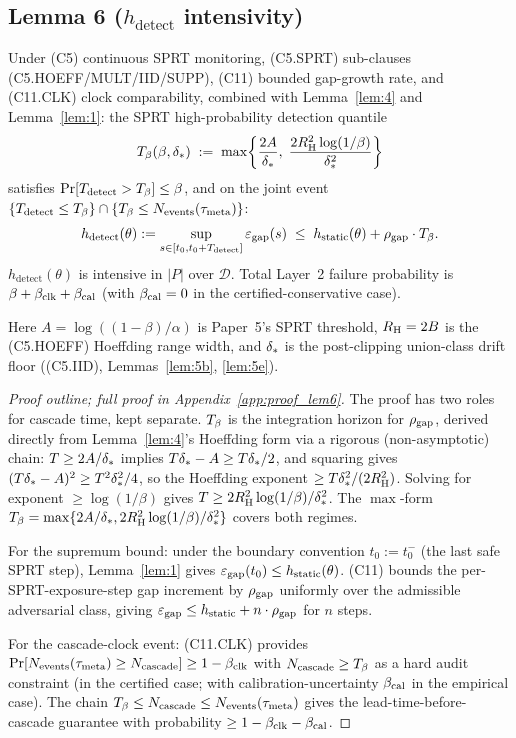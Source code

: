 \subsection{Lemma 6 (\texorpdfstring{$h_{\mathrm{detect}}$}{h\_detect} intensivity)}
\label{sec:lem6}

\renewcommand{\thelemma}{\arabic{lemma}}
\begin{lemma}
\label{lem:6}
Under (C5) continuous SPRT monitoring, (C5.SPRT) sub-clauses
(C5.HOEFF/MULT/IID/SUPP), (C11) bounded gap-growth rate, and
(C11.CLK) clock comparability, combined with Lemma~\ref{lem:4}
and Lemma~\ref{lem:1}: the SPRT high-probability detection quantile
\[
  T_{\beta}(\beta, \delta_{*}) \;:=\;
  \max\!\left\{\frac{2A}{\delta_{*}},\;
  \frac{2 R_{\mathrm{H}}^2 \log(1/\beta)}{\delta_{*}^2}\right\}
\]
satisfies $\Pr[T_{\mathrm{detect}} > T_{\beta}] \leq \beta$, and on
the joint event $\{T_{\mathrm{detect}} \leq T_{\beta}\} \cap \{T_{\beta}
\leq N_{\mathrm{events}}(\tau_{\mathrm{meta}})\}$:
\[
  h_{\mathrm{detect}}(\theta) := \sup_{s \in [t_0, t_0 +
  T_{\mathrm{detect}}]} \varepsilon_{\mathrm{gap}}(s) \;\leq\;
  h_{\mathrm{static}}(\theta) + \rho_{\mathrm{gap}} \cdot T_{\beta}.
\]
$h_{\mathrm{detect}}(\theta)$ is intensive in $|P|$ over
$\mathcal{D}$.  Total Layer~2 failure probability is $\beta + \beta_{\mathrm{clk}}
+ \beta_{\mathrm{cal}}$ (with $\beta_{\mathrm{cal}} = 0$ in the certified-conservative case).

Here $A = \log((1-\beta)/\alpha)$ is Paper~5's SPRT threshold,
$R_{\mathrm{H}} = 2B$ is the (C5.HOEFF) Hoeffding range width, and
$\delta_{*}$ is the post-clipping union-class drift floor
((C5.IID), Lemmas~\ref{lem:5b}, \ref{lem:5e}).
\end{lemma}

\begin{proof}[Proof outline; full proof in Appendix~\ref{app:proof_lem6}]
The proof has two roles for cascade time, kept separate.  $T_{\beta}$
is the integration horizon for $\rho_{\mathrm{gap}}$, derived directly from
Lemma~\ref{lem:4}'s Hoeffding form via a rigorous (non-asymptotic)
chain: $T \geq 2A/\delta_{*}$ implies $T\delta_{*} - A \geq
T\delta_{*}/2$, and squaring gives $(T\delta_{*} - A)^2 \geq
T^2\delta_{*}^2/4$, so the Hoeffding exponent $\geq T\delta_{*}^2/
(2R_{\mathrm{H}}^2)$.  Solving for exponent $\geq \log(1/\beta)$ gives
$T \geq 2R_{\mathrm{H}}^2\log(1/\beta)/\delta_{*}^2$.  The $\max$-form
$T_{\beta} = \max\{2A/\delta_{*}, 2R_{\mathrm{H}}^2\log(1/\beta)/\delta_{*}^2\}$
covers both regimes.

For the supremum bound: under the boundary convention $t_0 := t_0^-$ (the last
    safe SPRT step), Lemma~\ref{lem:1} gives $\varepsilon_{\mathrm{gap}}(t_0) \leq
    h_{\mathrm{static}}(\theta)$.  (C11) bounds the per-SPRT-exposure-step gap
    increment by $\rho_{\mathrm{gap}}$ uniformly over the admissible adversarial class,
    giving $\varepsilon_{\mathrm{gap}} \leq h_{\mathrm{static}} + n \cdot \rho_{\mathrm{gap}}$ for $n$ steps.

For the cascade-clock event: (C11.CLK) provides
$\Pr[N_{\mathrm{events}}(\tau_{\mathrm{meta}}) \geq N_{\mathrm{cascade}}] \geq 1 - \beta_{\mathrm{clk}}$ with
$N_{\mathrm{cascade}} \geq T_{\beta}$ as a hard audit constraint (in the certified
case; with calibration-uncertainty $\beta_{\mathrm{cal}}$ in the empirical case).
The chain $T_{\beta} \leq N_{\mathrm{cascade}} \leq N_{\mathrm{events}}(\tau_{\mathrm{meta}})$ gives
the lead-time-before-cascade guarantee with probability $\geq 1 -
\beta_{\mathrm{clk}} - \beta_{\mathrm{cal}}$.
\end{proof}

